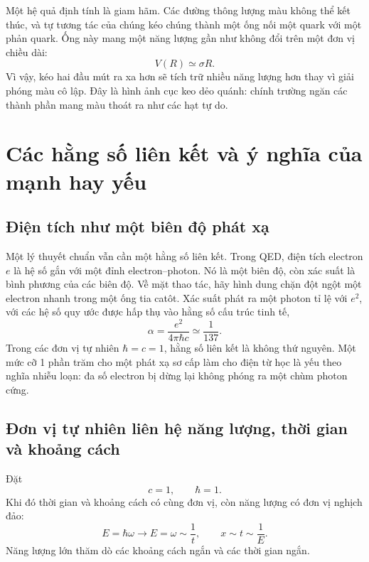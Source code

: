 Một hệ quả định tính là giam hãm. Các đường thông lượng màu không thể kết thúc, và tự tương tác của chúng kéo chúng thành một ống nối một quark với một phản quark. Ống này mang một năng lượng gần như không đổi trên một đơn vị chiều dài:
\begin{equation}
V(R)\simeq \sigma R.
\end{equation}
Vì vậy, kéo hai đầu mút ra xa hơn sẽ tích trữ nhiều năng lượng hơn thay vì giải phóng màu cô lập. Đây là hình ảnh cục keo dẻo quánh: chính trường ngăn các thành phần mang màu thoát ra như các hạt tự do.

\section{Các hằng số liên kết và ý nghĩa của mạnh hay yếu}

\subsection{Điện tích như một biên độ phát xạ}

Một lý thuyết chuẩn vẫn cần một hằng số liên kết. Trong QED, điện tích electron \(e\) là hệ số gắn với một đỉnh electron--photon. Nó là một biên độ, còn xác suất là bình phương của các biên độ. Về mặt thao tác, hãy hình dung chặn đột ngột một electron nhanh trong một ống tia catôt. Xác suất phát ra một photon tỉ lệ với \(e^2\), với các hệ số quy ước được hấp thụ vào hằng số cấu trúc tinh tế,
\begin{equation}
\alpha=\frac{e^2}{4\pi\hbar c}
\simeq \frac{1}{137}.
\label{eq:l5-alpha}
\end{equation}
Trong các đơn vị tự nhiên \(\hbar=c=1\), hằng số liên kết là không thứ nguyên. Một mức cỡ 1 phần trăm cho một phát xạ sơ cấp làm cho điện từ học là yếu theo nghĩa nhiễu loạn: đa số electron bị dừng lại không phóng ra một chùm photon cứng.

\subsection{Đơn vị tự nhiên liên hệ năng lượng, thời gian và khoảng cách}

Đặt
\begin{equation}
c=1,
\qquad
\hbar=1.
\end{equation}
Khi đó thời gian và khoảng cách có cùng đơn vị, còn năng lượng có đơn vị nghịch đảo:
\begin{equation}
E=\hbar\omega\longrightarrow E=\omega\sim\frac1t,
\qquad
x\sim t\sim\frac1E.
\end{equation}
Năng lượng lớn thăm dò các khoảng cách ngắn và các thời gian ngắn.

